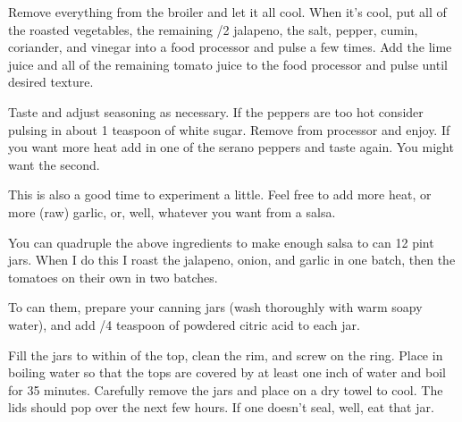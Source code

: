 \begin{IngredientsAndSteps}
{        Remove everything from the broiler and let it all cool. When it's cool,
        put all of the roasted vegetables, the remaining /2 jalapeno, the salt,
        pepper, cumin, coriander, and vinegar into a food processor and pulse a
        few times. Add the lime juice and all of the remaining tomato juice to the
        food processor and pulse until desired texture.

        Taste and adjust seasoning as necessary. If the peppers are too hot
        consider pulsing in about 1 teaspoon of white sugar. Remove from processor
        and enjoy. If you want more heat add in one of the serano peppers and taste
        again. You might want the second.

        This is also a good time to experiment a little. Feel free to add more heat,
        or more (raw) garlic, or, well, whatever you want from a salsa.
    }
\end{IngredientsAndSteps}

\begin{ChefNotes}
    {You can quadruple the above ingredients to make enough salsa to can 12 pint
        jars. When I do this I roast the jalapeno, onion, and garlic in one batch,
        then the tomatoes on their own in two batches.

        To can them, prepare your canning jars (wash thoroughly with warm soapy
        water), and add /4 teaspoon of powdered citric acid to each jar.

        Fill the jars to within  of the top, clean the rim, and screw
        on the ring. Place in boiling water so that the tops are covered by at
        least one inch of water and boil for 35 minutes. Carefully remove the
        jars and place on a dry towel to cool. The lids should pop over the next
        few hours. If one doesn't seal, well, eat that jar.}
\end{ChefNotes}